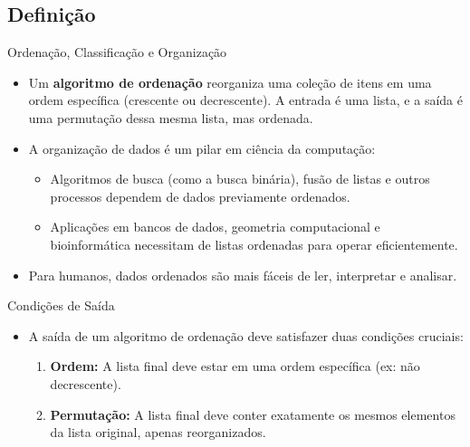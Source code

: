 \documentclass{beamer}
\begin{document}
\subsection{Definição}
\begin{frame}{Ordenação, Classificação e Organização}
\begin{itemize}
 \item Um \textbf{algoritmo de ordenação} reorganiza uma coleção de itens em uma ordem específica (crescente ou decrescente). A entrada é uma lista, e a saída é uma permutação dessa mesma lista, mas ordenada.
 \item A organização de dados é um pilar em ciência da computação:
 \begin{itemize}
  \item Algoritmos de busca (como a busca binária), fusão de listas e outros processos dependem de dados previamente ordenados.
  \item Aplicações em bancos de dados, geometria computacional e bioinformática necessitam de listas ordenadas para operar eficientemente.
 \end{itemize}
 \item Para humanos, dados ordenados são mais fáceis de ler, interpretar e analisar.
\end{itemize}
\end{frame}

\begin{frame}{Condições de Saída}
\begin{itemize}
 \item A saída de um algoritmo de ordenação deve satisfazer duas condições cruciais:
 \begin{enumerate}
  \item \textbf{Ordem:} A lista final deve estar em uma ordem específica (ex: não decrescente).
  \item \textbf{Permutação:} A lista final deve conter exatamente os mesmos elementos da lista original, apenas reorganizados.
 \end{enumerate}
\end{itemize}
\begin{center}
\end{center}
\end{frame}
\end{document}
